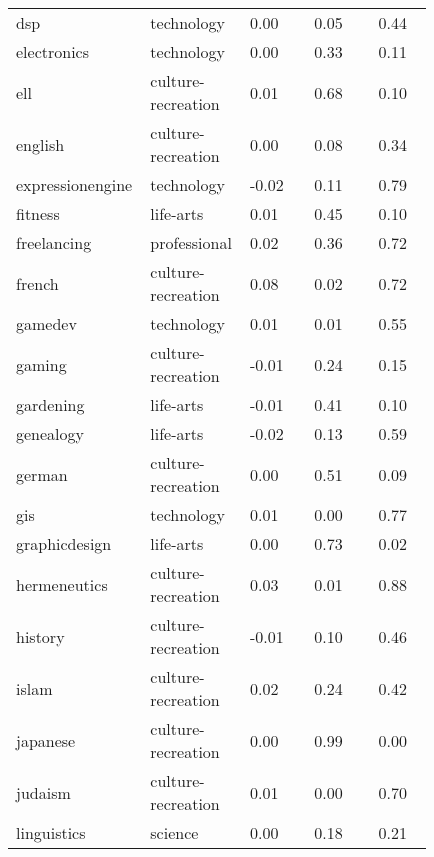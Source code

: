 \begin{longtabu}{@{}
	p{0.2\linewidth}
	p{0.2\linewidth}
	P{0.15\linewidth}
	P{0.15\linewidth}
	P{0.13\linewidth}@{}}
dsp              & technology         & 0.00        & 0.05          & 0.44           \\
electronics      & technology         & 0.00        & 0.33          & 0.11           \\
ell              & culture-recreation & 0.01        & 0.68          & 0.10           \\
english          & culture-recreation & 0.00        & 0.08          & 0.34           \\
expressionengine & technology         & -0.02       & 0.11          & 0.79           \\
fitness          & life-arts          & 0.01        & 0.45          & 0.10           \\
freelancing      & professional       & 0.02        & 0.36          & 0.72           \\
french           & culture-recreation & 0.08        & 0.02          & 0.72           \\
gamedev          & technology         & 0.01        & 0.01          & 0.55           \\
gaming           & culture-recreation & -0.01       & 0.24          & 0.15           \\
gardening        & life-arts          & -0.01       & 0.41          & 0.10           \\
genealogy        & life-arts          & -0.02       & 0.13          & 0.59           \\
german           & culture-recreation & 0.00        & 0.51          & 0.09           \\
gis              & technology         & 0.01        & 0.00          & 0.77           \\
graphicdesign    & life-arts          & 0.00        & 0.73          & 0.02           \\
hermeneutics     & culture-recreation & 0.03        & 0.01          & 0.88           \\
history          & culture-recreation & -0.01       & 0.10          & 0.46           \\
islam            & culture-recreation & 0.02        & 0.24          & 0.42           \\
japanese         & culture-recreation & 0.00        & 0.99          & 0.00           \\
judaism          & culture-recreation & 0.01        & 0.00          & 0.70           \\
linguistics      & science            & 0.00        & 0.18          & 0.21           \\

\end{longtabu}
